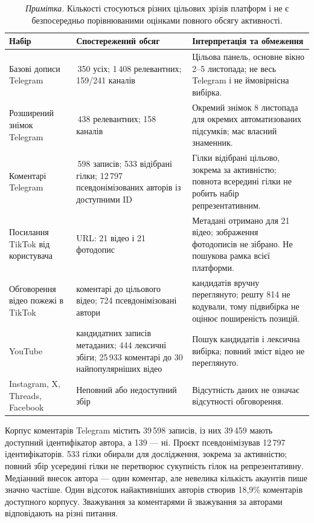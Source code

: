 \begin{table}[!t]
\centering
\small
\caption{Зібрані набори даних і зміст їхніх знаменників.}
\begin{tabularx}{\textwidth}{>{\raggedright\arraybackslash}p{}>{\raggedright\arraybackslash}p{}>{\raggedright\arraybackslash}X}
\toprule
\bfseries Набір & \bfseries Спостережений обсяг & \bfseries Інтерпретація та обмеження \\
\midrule
Базові дописи Telegram & 23\,350 усіх; 1\,408 релевантних; 159/241 каналів & Цільова панель, основне вікно 2–5 листопада; не весь Telegram і не ймовірнісна вибірка. \\
Розширений знімок Telegram & 1\,438 релевантних; 158 каналів & Окремий знімок 8 листопада для окремих автоматизованих підсумків; має власний знаменник. \\
Коментарі Telegram & 39\,598 записів; 533 відібрані гілки; 12\,797 псевдонімізованих авторів із доступними ID & Гілки відібрані цільово, зокрема за активністю; повнота всередині гілки не робить набір репрезентативним. \\
Посилання TikTok від користувача & 42 URL: 21 відео і 21 фотодопис & Метадані отримано для 21 відео; зображення фотодописів не зібрано. Не пошукова рамка всієї платформи. \\
Обговорення відео пожежі в TikTok & 883 коментарі до цільового відео; 724 псевдонімізовані автори & 69 кандидатів вручну переглянуто; решту 814 не кодували, тому підвибірка не оцінює поширеність позицій. \\
YouTube & 617 кандидатних записів метаданих; 444 лексичні збіги; 25\,933 коментарі до 30 найпопулярніших відео & Пошук кандидатів і лексична вибірка; повний зміст відео не переглянуто. \\
Instagram, X, Threads, Facebook & Неповний або недоступний збір & Відсутність даних не означає відсутності обговорення. \\
\bottomrule
\end{tabularx}
\caption*{\small\textit{Примітка.} Кількості стосуються різних цільових зрізів платформ і не є безпосередньо порівнюваними оцінками повного обсягу активності.}
\end{table}

Корпус коментарів Telegram містить 39\,598 записів, із них 39\,459 мають доступний ідентифікатор автора, а 139 — ні. Проєкт псевдонімізував 12\,797 ідентифікаторів. 533 гілки обирали для дослідження, зокрема за активністю; повний збір усередині гілки не перетворює сукупність гілок на репрезентативну. Медіанний внесок автора — один коментар, але невелика кількість акаунтів пише значно частіше. Один відсоток найактивніших авторів створив 18,9\% коментарів доступного корпусу. Зважування за коментарями й зважування за авторами відповідають на різні питання.

